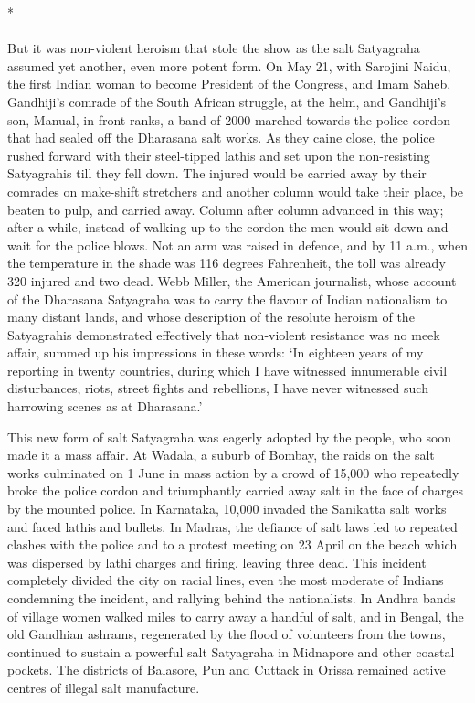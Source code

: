 \begin{center}*\end{center}

\paragraph*{}


But it was non-violent heroism that stole the show as the salt Satyagraha assumed yet another, even more potent form. On May 21, with Sarojini Naidu, the first Indian woman to become President of the Congress, and Imam Saheb, Gandhiji's comrade of the South African struggle, at the helm, and Gandhiji's son, Manual, in front ranks, a band of 2000 marched towards the police cordon that had sealed off the Dharasana salt works. As they caine close, the police rushed forward with their steel-tipped lathis and set upon the non-resisting Satyagrahis till they fell down. The injured would be carried away by their comrades on make-shift stretchers and another column would take their place, be beaten to pulp, and carried away. Column after column advanced in this way; after a while, instead of walking up to the cordon the men would sit down and wait for the police blows. Not an arm was raised in defence, and by 11 a.m., when the temperature in the shade was 116 degrees Fahrenheit, the toll was already 320 injured and two dead. Webb Miller, the American journalist, whose account of the Dharasana Satyagraha was to carry the flavour of Indian nationalism to many distant lands, and whose description of the resolute heroism of the Satyagrahis demonstrated effectively that non-violent resistance was no meek affair, summed up his impressions in these words: `In eighteen years of my reporting in twenty countries, during which I have witnessed innumerable civil disturbances, riots, street fights and rebellions, I have never witnessed such harrowing scenes as at Dharasana.'

This new form of salt Satyagraha was eagerly adopted by the people, who soon made it a mass affair. At Wadala, a suburb of Bombay, the raids on the salt works culminated on 1 June in mass action by a crowd of 15,000 who repeatedly broke the police cordon and triumphantly carried away salt in the face of charges by the mounted police. In Karnataka, 10,000 invaded the Sanikatta salt works and faced lathis and bullets. In Madras, the defiance of salt laws led to repeated clashes with the police and to a protest meeting on 23 April on the beach which was dispersed by lathi charges and firing, leaving three dead. This incident completely divided the city on racial lines, even the most moderate of Indians condemning the incident, and rallying behind the nationalists. In Andhra bands of village women walked miles to carry away a handful of salt, and in Bengal, the old Gandhian ashrams, regenerated by the flood of volunteers from the towns, continued to sustain a powerful salt Satyagraha in Midnapore and other coastal pockets. The districts of Balasore, Pun and Cuttack in Orissa remained active centres of illegal salt manufacture.

